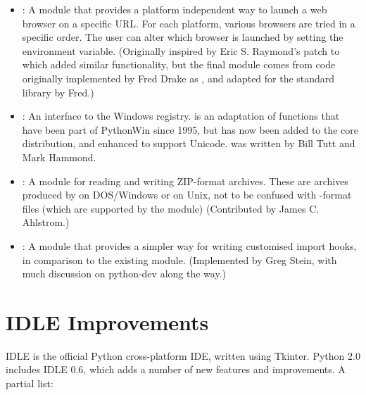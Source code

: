 \documentclass{howto}
\begin{document}
\begin{itemize}
\item{:} A module that provides a platform independent
way to launch a web browser on a specific URL. For each platform, various
browsers are tried in a specific order. The user can alter which browser
is launched by setting the  environment variable. 
(Originally inspired by Eric S. Raymond's patch to 
which added similar functionality, but
the final module comes from code originally 
implemented by Fred Drake as ,
and adapted for the standard library by Fred.)

\item{:} An interface to the
Windows registry.   is an adaptation of functions that
have been part of PythonWin since 1995, but has now been added to the core 
distribution, and enhanced to support Unicode.  
 was written by Bill Tutt and Mark Hammond.

\item{:} A module for reading and writing ZIP-format
archives.  These are archives produced by  on
DOS/Windows or  on Unix, not to be confused with
-format files (which are supported by the 
module)
(Contributed by James C. Ahlstrom.)

\item{:} A module that provides a simpler way for
writing customised import hooks, in comparison to the existing
 module.  (Implemented by Greg Stein, with much
discussion on python-dev along the way.)

\end{itemize}

\section{IDLE Improvements}

IDLE is the official Python cross-platform IDE, written using Tkinter.
Python 2.0 includes IDLE 0.6, which adds a number of new features and
improvements.  A partial list:
\end{document}
